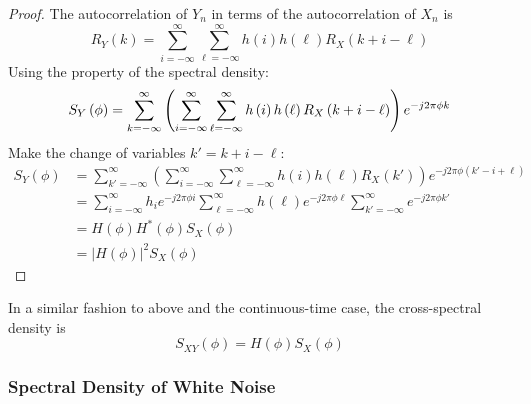 \documentclass[11pt]{report} %
\begin{document}
\begin{proof}
The autocorrelation of $Y_{n}$ in terms of the autocorrelation of $X_{n}$ is
\begin{equation}
R_{Y}\left(k\right) = \sum_{i = -\infty}^{\infty}\sum_{\ell = -\infty}^{\infty}h\left(i\right)h\left(\ell\right)R_{X}\left(k + i - \ell\right)
\end{equation}
Using the property of the spectral density:
\begin{equation}
S_{Y}\left(\phi\right) = \sum_{k = -\infty}^{\infty}\left(\sum_{i = -\infty}^{\infty}\sum_{\ell = -\infty}^{\infty}h\left(i\right)h\left(\ell\right)R_{X}\left(k + i - \ell\right)\right)e^{-j2\pi\phi k} \\
\end{equation}
Make the change of variables $k' = k + i - \ell$:
\begin{align}
S_{Y}\left(\phi\right) &= \sum_{k' = -\infty}^{\infty}\left(\sum_{i = -\infty}^{\infty}\sum_{\ell = -\infty}^{\infty}h\left(i\right)h\left(\ell\right)R_{X}\left(k'\right)\right)e^{-j2\pi\phi \left(k' - i + \ell\right)} \\
&= \sum_{i = -\infty}^{\infty}h_{i}e^{-j2\pi\phi i}\sum_{\ell = -\infty}^{\infty}h\left(\ell\right)e^{-j2\pi\phi \ell}\sum_{k' = -\infty}^{\infty}e^{-j2\pi\phi k'} \\
&= H\left(\phi\right)H^{*}\left(\phi\right)S_{X}\left(\phi\right) \\
&= \left|H\left(\phi\right)\right|^{2}S_{X}\left(\phi\right)
\end{align}
\end{proof}
In a similar fashion to above and the continuous-time case, the cross-spectral density is
\begin{equation}
S_{XY}\left(\phi\right) = H\left(\phi\right)S_{X}\left(\phi\right)
\end{equation}

\subsubsection{Spectral Density of White Noise}
\end{document}
